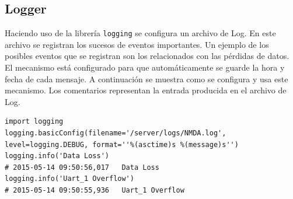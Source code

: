 	\subsection{Logger}
		Haciendo uso de la librería \texttt{logging}\cite{py_logging} se configura un archivo de Log. En este archivo se registran los sucesos
		de eventos importantes. Un ejemplo de los posibles eventos que se registran son los relacionados con las pérdidas de datos. El
		mecanismo está configurado para que automáticamente se guarde la hora y fecha de cada mensaje. A continuación se muestra como se
		configura y usa este mecanismo. Los comentarios representan la entrada producida en el archivo de Log.
		\begin{lstlisting}[style=myPython]
import logging
logging.basicConfig(filename='/server/logs/NMDA.log', level=logging.DEBUG, format=''%(asctime)s %(message)s'')
logging.info('Data Loss')   
# 2015-05-14 09:50:56,017   Data Loss
logging.info('Uart_1 Overflow') 
# 2015-05-14 09:50:55,936   Uart_1 Overflow
		\end{lstlisting}
